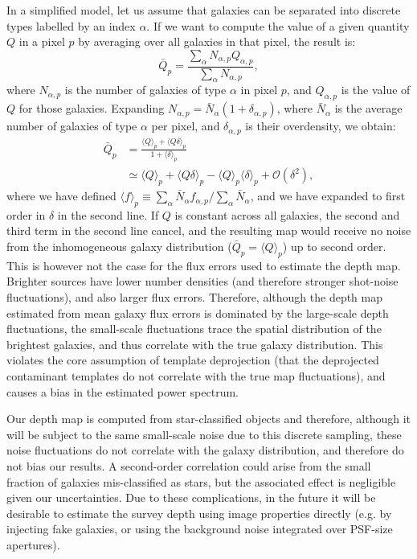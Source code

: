 \documentclass[a4paper,11pt]{article}
\begin{document}
  In a simplified model, let us assume that galaxies can be separated into discrete types labelled by an index $\alpha$. If we want to compute the value of a given quantity $Q$ in a pixel $p$ by averaging over all galaxies in that pixel, the result is:
  \begin{equation}
    \bar{Q}_p = \frac{\sum_\alpha N_{\alpha,p}Q_{\alpha,p}}{\sum_\alpha N_{\alpha,p}},
  \end{equation}
  where $N_{\alpha,p}$ is the number of galaxies of type $\alpha$ in pixel $p$, and $Q_{\alpha,p}$ is the value of $Q$ for those galaxies. Expanding $N_{\alpha,p}=\bar{N}_\alpha(1+\delta_{\alpha,p})$, where $\bar{N}_\alpha$ is the average number of galaxies of type $\alpha$ per pixel, and $\delta_{\alpha,p}$ is their overdensity, we obtain:
  \begin{align}\nonumber
    \bar{Q}_p&=\frac{\langle Q\rangle_p+\langle Q\delta\rangle_p}{1+\langle \delta\rangle_p}\\
             &\simeq\langle Q\rangle_p+\langle Q\delta\rangle_p-\langle Q\rangle_p\langle\delta\rangle_p+\mathcal{O}(\delta^2),
  \end{align}
  where we have defined $\langle f\rangle_p\equiv \sum_\alpha \bar{N}_\alpha f_{\alpha,p}/\sum_\alpha \bar{N}_\alpha$, and we have expanded to first order in $\delta$ in the second line. If $Q$ is constant across all galaxies, the second and third term in the second line cancel, and the resulting map would receive no noise from the inhomogeneous galaxy distribution ($\bar{Q}_p=\langle Q\rangle_p$) up to second order. This is however not the case for the flux errors used to estimate the depth map. Brighter sources have lower number densities (and therefore stronger shot-noise fluctuations), and also larger flux errors. Therefore, although the depth map estimated from mean galaxy flux errors is dominated by the large-scale depth fluctuations, the small-scale fluctuations trace the spatial distribution of the brightest galaxies, and thus correlate with the true galaxy distribution. This violates the core assumption of template deprojection (that the deprojected contaminant templates do not correlate with the true map fluctuations), and causes a bias in the estimated power spectrum.
  
  Our depth map is computed from star-classified objects and therefore, although it will be subject to the same small-scale noise due to this discrete sampling, these noise fluctuations do not correlate with the galaxy distribution, and therefore do not bias our results. A second-order correlation could arise from the small fraction of galaxies mis-classified as stars, but the associated effect is negligible given our uncertainties. Due to these complications, in the future it will be desirable to estimate the survey depth using image properties directly (e.g. by injecting fake galaxies, or using the background noise integrated over PSF-size apertures).
  
\end{document}
